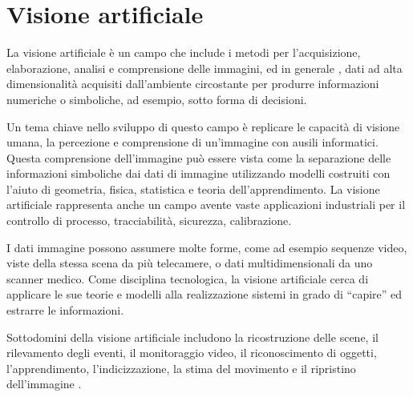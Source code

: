 \chapter{Visione artificiale}

La visione artificiale è un campo che include i metodi per l'acquisizione, elaborazione, analisi e comprensione delle immagini, ed in generale , dati ad alta dimensionalità acquisiti dall'ambiente circostante per produrre informazioni numeriche o simboliche, ad esempio, sotto forma di decisioni.

Un tema chiave nello sviluppo di questo campo è replicare le capacità di visione umana, la percezione e comprensione di un'immagine con ausili informatici. Questa comprensione dell'immagine può essere vista come la separazione delle informazioni simboliche dai dati di immagine utilizzando modelli costruiti con l'aiuto di geometria, fisica, statistica e teoria dell'apprendimento. La visione artificiale rappresenta anche un campo avente vaste applicazioni industriali per il controllo di processo, tracciabilità, sicurezza, calibrazione.

I dati immagine possono assumere molte forme, come ad esempio sequenze video, viste della stessa scena da più telecamere, o dati multidimensionali da uno scanner medico. Come disciplina tecnologica, la visione artificiale cerca di applicare le sue teorie e modelli alla realizzazione sistemi in grado di ``capire'' ed estrarre le informazioni.

Sottodomini della visione artificiale includono la ricostruzione delle scene, il rilevamento degli eventi, il monitoraggio video, il riconoscimento di oggetti, l'apprendimento, l'indicizzazione, la stima del movimento  e il ripristino dell'immagine .


\endinput